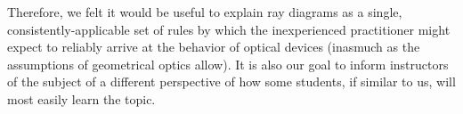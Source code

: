 \documentclass[letterpaper,10pt]{article}
\newenvironment{myindentpar}[1]
{\begin{list}{}
	{\setlength{\leftmargin}{#1}}
	\setlength{\parskip}{10pt}
	\item[]
}
{\end{list}}
\begin{document}
{\begin{myindentpar}{20pt}
  Therefore, we felt it would be useful to explain ray diagrams as a single, consistently-applicable set of rules by which the inexperienced practitioner might expect to reliably arrive at the behavior of optical devices (inasmuch as the assumptions of geometrical optics allow).
  It is also our goal to inform instructors of the subject of a different perspective of how some students, if similar to us, will most easily learn the topic.
  




  



  
  
  


\end{myindentpar}}
\end{document}
